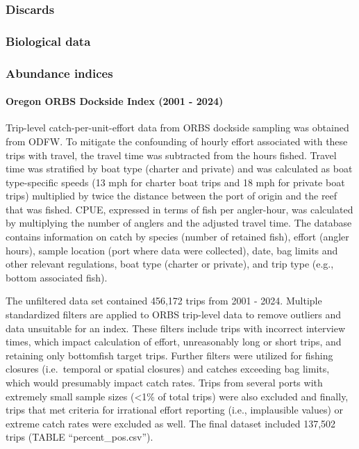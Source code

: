 \documentclass[
]{scrartcl}
\let\oldparagraph\paragraph
\renewcommand{\paragraph}[1]{\oldparagraph{#1}\mbox{}}
\begin{document}
\subsubsection{Discards}\label{discards}

\subsubsection{Biological data}\label{biological-data}

\subsubsection{Abundance indices}\label{abundance-indices}

\paragraph{Oregon ORBS Dockside Index (2001 -
2024)}\label{oregon-orbs-dockside-index-2001---2024}

Trip-level catch-per-unit-effort data from ORBS dockside sampling was
obtained from ODFW. To mitigate the confounding of hourly effort
associated with these trips with travel, the travel time was subtracted
from the hours fished. Travel time was stratified by boat type (charter
and private) and was calculated as boat type-specific speeds (13 mph for
charter boat trips and 18 mph for private boat trips) multiplied by
twice the distance between the port of origin and the reef that was
fished. CPUE, expressed in terms of fish per angler-hour, was calculated
by multiplying the number of anglers and the adjusted travel time. The
database contains information on catch by species (number of retained
fish), effort (angler hours), sample location (port where data were
collected), date, bag limits and other relevant regulations, boat type
(charter or private), and trip type (e.g., bottom associated fish).

The unfiltered data set contained 456,172 trips from 2001 - 2024.
Multiple standardized filters are applied to ORBS trip-level data to
remove outliers and data unsuitable for an index. These filters include
trips with incorrect interview times, which impact calculation of
effort, unreasonably long or short trips, and retaining only bottomfish
target trips. Further filters were utilized for fishing closures
(i.e.~temporal or spatial closures) and catches exceeding bag limits,
which would presumably impact catch rates. Trips from several ports with
extremely small sample sizes (\textless1\% of total trips) were also
excluded and finally, trips that met criteria for irrational effort
reporting (i.e., implausible values) or extreme catch rates were
excluded as well. The final dataset included 137,502 trips (TABLE
``percent\_pos.csv'').
\end{document}
